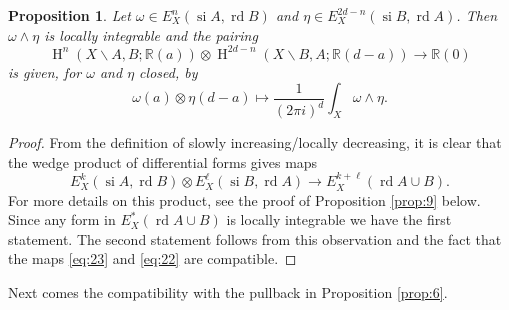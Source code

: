 \documentclass[11pt,a4paper]{amsart}
\newcommand{\R}{\mathds{R}}
\DeclareMathOperator{\si}{si}
\DeclareMathOperator{\rd}{rd}
\DeclareMathOperator{\rH}{H}
\numberwithin{equation}{section}
\theoremstyle{plain}
\newtheorem{prop}{Proposition}[section]
\theoremstyle{definition}
\begin{document}
\begin{prop}\label{prop:4-5}
  Let $\omega \in E_{X}^{n}(\si A, \rd B)$
  and $\eta \in E_{X}^{2d-n}(\si B, \rd A)$. Then $\omega \wedge \eta$ is
  locally integrable and the pairing
  \begin{equation}\label{eq:24}
    \rH^{n}(X\smallsetminus A,B;\R(a))\otimes
    \rH^{2d-n}(X\smallsetminus B,A;\R(d-a))\longrightarrow \R(0)
  \end{equation}
  is given, for $\omega $ and $\eta$ closed, by 
  \begin{displaymath}
    \omega(a) \otimes \eta(d-a)
    \mapsto \frac{1}{(2\pi i)^{d}}\int_{X}\omega \wedge \eta.
  \end{displaymath}
\end{prop}
\begin{proof}
  From the definition of slowly increasing/locally decreasing, it is
  clear that the wedge product of differential forms gives maps 
  \begin{equation}\label{eq:23}
    E_{X}^{k}(\si A,\rd B)\otimes
    E_{X}^{\ell}(\si B,\rd A)\longrightarrow
    E_{X}^{k+\ell}(\rd A\cup B).
  \end{equation}
  For more details on this product, see the proof of Proposition \ref{prop:9} below.
  Since any form in $E_{X}^{\ast}(\rd A\cup B)$ is locally integrable we
  have the first statement.
 The second statement follows from this observation
  and the fact that the maps \eqref{eq:23} and \eqref{eq:22} are
  compatible.  
\end{proof}

Next  comes the compatibility with the pullback in Proposition
\ref{prop:6}. 
\end{document}

